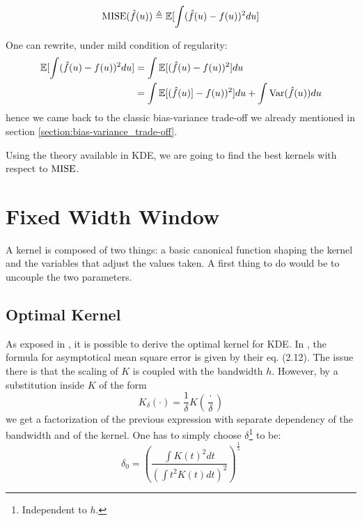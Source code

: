 \documentclass[11pt]{book}
\begin{document}
\begin{equation}
\operatorname{MISE} ( \hat{f}(u) ) \triangleq  \mathbb E [ \int ( \hat{f}(u) - f(u) )^2 du ]
\end{equation}

\begin{remarque}
One can rewrite, under mild condition of regularity:
\begin{align*}
\mathbb E [ \int ( \hat{f}(u) - f(u) )^2 du ] &= \int \mathbb E [( \hat{f}(u) - f(u) )^2 ] du \\
&= \int  \mathbb E[ (\hat{f}(u) ] - f(u) )^2 ] du + \int \mathrm{Var}( \hat{f}(u)) du 
\end{align*}
hence we came back to the classic bias-variance trade-off we already mentioned in section \ref{section:bias-variance_trade-off}.
\end{remarque}

Using the theory available in KDE, we are going to find the best kernels with respect to $\operatorname{MISE}$.

\section{Fixed Width Window}
\label{section:FWW}

A kernel is composed of two things: a basic canonical function shaping the kernel and the variables that adjust the values taken. A first thing to do would be to uncouple the two parameters.

\subsection{Optimal Kernel}

As exposed in \cite{Wand}, it is possible to derive the optimal kernel for KDE. In \cite{Wand}, the formula for asymptotical mean square error is given by their eq. (2.12). The issue there is that the scaling of $K$ is coupled with the bandwidth $h$. However, by a substitution inside $K$ of the form 
$$ K_{\delta} ( \cdot ) = \frac 1  {\delta } K \left ( \frac {\cdot } { \delta } \right ) $$
we get a factorization of the previous expression with separate dependency of the bandwidth and of the kernel. One has to simply choose $\delta$\footnote{Independent to $h$.} to be: $$ \delta_0 = \left ( \frac{ \int K(t)^2 dt }{ \left ( \int t^2 K(t) dt \right )^2 } \right ) ^{\frac 1 5} $$
\end{document}
